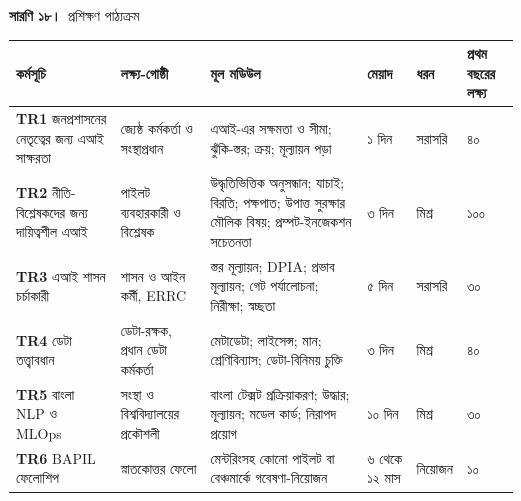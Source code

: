 \documentclass[border=10pt]{standalone}
\begin{document}
\begin{minipage}{22cm}
{\large\bfseries সারণি ১৮।}\ {\large প্রশিক্ষণ পাঠ্যক্রম}\par\vspace{7pt}
\small
{}
\begin{tabularx}{\linewidth}{@{}>{\hsize=1.273\hsize\raggedright\arraybackslash}X>{\hsize=1.030\hsize\raggedright\arraybackslash}X>{\hsize=1.818\hsize\raggedright\arraybackslash}X>{\hsize=0.667\hsize\raggedright\arraybackslash}X>{\hsize=0.667\hsize\raggedright\arraybackslash}X>{\hsize=0.545\hsize\raggedright\arraybackslash}X@{}}
\arrayrulecolor{bapilrule}\toprule
\rowcolor{white}\textbf{কর্মসূচি} & \textbf{লক্ষ্য-গোষ্ঠী} & \textbf{মূল মডিউল} & \textbf{মেয়াদ} & \textbf{ধরন} & \textbf{প্রথম বছরের লক্ষ্য} \\
\midrule
\textbf{TR1} জনপ্রশাসনের নেতৃত্বের জন্য এআই সাক্ষরতা & জ্যেষ্ঠ কর্মকর্তা ও সংস্থাপ্রধান & এআই-এর সক্ষমতা ও সীমা; ঝুঁকি-স্তর; ক্রয়; মূল্যায়ন পড়া & ১ দিন & সরাসরি & ৪০ \\
\textbf{TR2} নীতি-বিশ্লেষকদের জন্য দায়িত্বশীল এআই & পাইলট ব্যবহারকারী ও বিশ্লেষক & উদ্ধৃতিভিত্তিক অনুসন্ধান; যাচাই; বিরতি; পক্ষপাত; উপাত্ত সুরক্ষার মৌলিক বিষয়; প্রম্পট-ইনজেকশন সচেতনতা & ৩ দিন & মিশ্র & ১০০ \\
\textbf{TR3} এআই শাসন চর্চাকারী & শাসন ও আইন কর্মী, ERRC & স্তর মূল্যায়ন; DPIA; প্রভাব মূল্যায়ন; গেট পর্যালোচনা; নিরীক্ষা; স্বচ্ছতা & ৫ দিন & সরাসরি & ৩০ \\
\textbf{TR4} ডেটা তত্ত্বাবধান & ডেটা-রক্ষক, প্রধান ডেটা কর্মকর্তা & মেটাডেটা; লাইসেন্স; মান; শ্রেণিবিন্যাস; ডেটা-বিনিময় চুক্তি & ৩ দিন & মিশ্র & ৪০ \\
\textbf{TR5} বাংলা NLP ও MLOps & সংস্থা ও বিশ্ববিদ্যালয়ের প্রকৌশলী & বাংলা টেক্সট প্রক্রিয়াকরণ; উদ্ধার; মূল্যায়ন; মডেল কার্ড; নিরাপদ প্রয়োগ & ১০ দিন & মিশ্র & ৩০ \\
\textbf{TR6} BAPIL ফেলোশিপ & স্নাতকোত্তর ফেলো & মেন্টরিংসহ কোনো পাইলট বা বেঞ্চমার্কে গবেষণা-নিয়োজন & ৬ থেকে ১২ মাস & নিয়োজন & ১০ \\
\bottomrule
\end{tabularx}
\par\vspace{5pt}{\footnotesize\itshape সকল কোর্স-উপকরণ বাংলা ও ইংরেজিতে CC BY 4.0 লাইসেন্সে প্রকাশিত হয়। প্রথম বছরে ১০০ প্রশিক্ষিত কর্মকর্তার KPI-তে TR2-এর অংশগ্রহণকারীরা গণ্য; TR1 অবহিতকরণ ও বিশেষায়িত দল TR3 থেকে TR5 আলাদাভাবে গণ্য এবং বাজেটের বিশেষায়িত কোর্স-খাত থেকে অর্থায়িত (সারণি ৪৯)।}
\par{}
\end{minipage}
\end{document}
